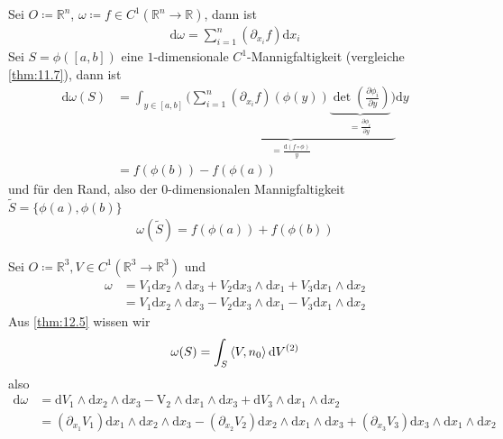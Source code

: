 \begin{example} \label{thm:8.4}
  \begin{enum-arab}
  \item
    Sei $O \coloneq \mathbb{R}^n$, $\omega \coloneq f \in C^1 (\mathbb{R}^n \to \mathbb{R})$, dann ist
    \begin{align*}
      \mathrm d \omega = \sum_{i=1}^n (\partial_{x_i}f) \mathrm d x_i
    \end{align*}
    Sei $S = \phi([a,b])$ eine $1$-dimensionale $C^1$-Mannigfaltigkeit (vergleiche \ref{thm:11.7}), dann ist
    \begin{align*}
      \mathrm d \omega(S) &= \int_{y \in [a,b]} \underbrace{\bigg( \sum_{i=1}^n (\partial_{x_i}f)(\phi(y)) \underbrace{\det ( \tfrac{\partial \phi_i}{\partial y})}_{= \frac{\partial \phi_i}{\partial y}} \bigg)}_{= \frac{\mathrm d (f\circ \phi)}{y}} \mathrm d y \\
      &= f(\phi(b)) - f(\phi(a))
    \end{align*}
    und für den Rand, also der $0$-dimensionalen Mannigfaltigkeit $\tilde S = \{\phi(a), \phi(b)\}$
    \begin{align*}
      \omega(\tilde S) = f(\phi(a)) + f(\phi(b))
    \end{align*}
  \item
    Sei $O \coloneq \mathbb{R}^3, V \in C^1 (\mathbb{R}^3 \to \mathbb{R}^3)$ und
    \begin{align*}
      \omega &= V_1 \mathrm d x_2 \wedge \mathrm d x_3 + V_2 \mathrm d x_3 \wedge \mathrm d x_1 + V_3 \mathrm d x_1 \wedge \mathrm d x_2 \\
      &= V_1 \mathrm d x_2 \wedge \mathrm d x_3 - V_2 \mathrm d x_3 \wedge \mathrm d x_1 - V_3 \mathrm d x_1 \wedge \mathrm d x_2
    \end{align*}
    Aus \ref{thm:12.5} wissen wir
    \begin{align*}
      \omega(S) = \int_S \braket{V, n_0} \mathrm d V^{(2)}
    \end{align*}
    also
    \begin{align*}
      \mathrm d \omega &= \mathrm d V_1 \wedge \mathrm d x_2 \wedge \mathrm d x_3 - \mathrm V_2 \wedge \mathrm d x_1 \wedge \mathrm d x_3 + \mathrm d V_3 \wedge \mathrm d x_1 \wedge \mathrm d x_2 \\
      &= (\partial_{x_1} V_1) \mathrm d x_1 \wedge \mathrm d x_2 \wedge \mathrm d x_3 - (\partial_{x_2} V_2) \mathrm d x_2 \wedge \mathrm d x_1 \wedge \mathrm d x_3 + (\partial_{x_3} V_3) \mathrm d x_3 \wedge \mathrm d x_1 \wedge \mathrm d x_2 \\

\end{align*}
\end{enum-arab}
\end{example}
